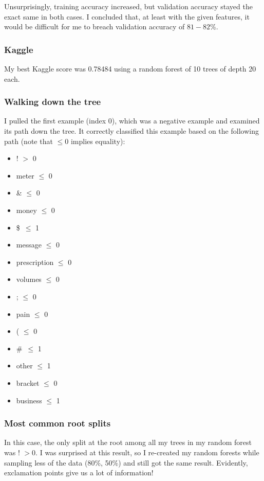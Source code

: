 \documentclass{report}
\begin{document}
Unsurprisingly, training accuracy increased, but validation accuracy stayed the exact same in both cases. I concluded that, at least with the given features, it would be difficult for me to breach validation accuracy of $81-82\%$. 

\subsubsection{Kaggle}

My best Kaggle score was 0.78484 using a random forest of 10 trees of depth 20 each. 

\subsubsection{Walking down the tree}

I pulled the first example (index 0), which was a negative example and examined its path down the tree. It correctly classified this example based on the following path (note that $\leq0$ implies equality):

\begin{itemize}
\item ! $>$ 0
\item meter $\leq$ 0
\item \& $\leq$ 0
\item money $\leq$ 0
\item \$\ $\leq$ 1
\item message $\leq$ 0
\item prescription $\leq$ 0
\item volumes $\leq$ 0
\item ; $\leq$ 0
\item pain $\leq$ 0
\item ( $\leq$ 0
\item \#\ $\leq$ 1
\item other $\leq$ 1
\item bracket $\leq$ 0
\item business $\leq$ 1
\end{itemize}

\subsubsection{Most common root splits}
In this case, the only split at the root among all my trees in my random forest was ! $>0$. I was surprised at this result, so I re-created my random forests while sampling less of the data (80\%, 50\%) and still got the same result. Evidently, exclamation points give us a lot of information!
\end{document}
